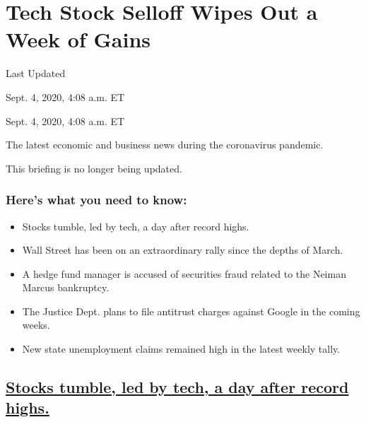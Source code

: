 \hypertarget{tech-stock-selloff-wipes-out-a-week-of-gains}{%
\section{Tech Stock Selloff Wipes Out a Week of
Gains}\label{tech-stock-selloff-wipes-out-a-week-of-gains}}

Last Updated

Sept. 4, 2020, 4:08 a.m. ET

Sept. 4, 2020, 4:08 a.m. ET

The latest economic and business news during the coronavirus pandemic.

This briefing is no longer being updated.

\hypertarget{heres-what-you-need-to-know}{%
\subsubsection{Here's what you need to
know:}\label{heres-what-you-need-to-know}}

\begin{itemize}
\item
  \protect\hyperlink{stocks-tumble-led-by-tech-a-day-after-record-highs}{}

  Stocks tumble, led by tech, a day after record highs.
\item
  \protect\hyperlink{wall-street-has-been-on-an-extraordinary-rally-since-the-depths-of-march}{}

  Wall Street has been on an extraordinary rally since the depths of
  March.
\item
  \protect\hyperlink{a-hedge-fund-manager-is-accused-of-securities-fraud-related-to-the-neiman-marcus-bankruptcy}{}

  A hedge fund manager is accused of securities fraud related to the
  Neiman Marcus bankruptcy.
\item
  \protect\hyperlink{the-justice-dept-plans-to-file-antitrust-charges-against-google-in-the-coming-weeks}{}

  The Justice Dept. plans to file antitrust charges against Google in
  the coming weeks.
\item
  \protect\hyperlink{new-state-unemployment-claims-remained-high-in-the-latest-weekly-tally}{}

  New state unemployment claims remained high in the latest weekly
  tally.
\end{itemize}

\hypertarget{stocks-tumble-led-by-tech-a-day-after-record-highs}{%
\subsection{\texorpdfstring{\protect\hyperlink{stocks-tumble-led-by-tech-a-day-after-record-highs}{Stocks
tumble, led by tech, a day after record
highs.}}{Stocks tumble, led by tech, a day after record highs.}}\label{stocks-tumble-led-by-tech-a-day-after-record-highs}}

